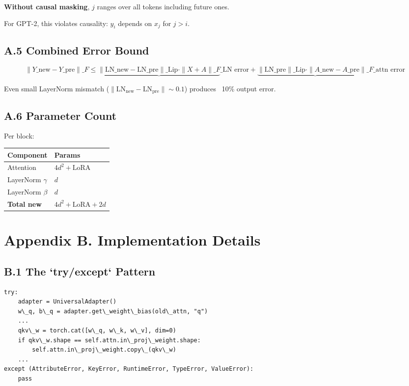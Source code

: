 \textbf{Without causal masking}, $j$ ranges over all tokens including future ones.

For GPT-2, this violates causality: $y_i$ depends on $x_j$ for $j > i$.

\subsection{A.5 Combined Error Bound}

\[
\|Y\_\text{new} - Y\_\text{pre}\|\_F \leq \underbrace{\|\text{LN}\_\text{new} - \text{LN}\_\text{pre}\|\_\text{Lip} \cdot \|X + A\|\_F}\_{\text{LN error}} + \underbrace{\|\text{LN}\_\text{pre}\|\_\text{Lip} \cdot \|A\_\text{new} - A\_\text{pre}\|\_F}\_{\text{attn error}}
\tag{A.7}
\]

Even small LayerNorm mismatch ($\|\text{LN}_\text{new} - \text{LN}_\text{pre}\| \sim 0.1$) 
produces ~10\% output error.

\subsection{A.6 Parameter Count}

Per block:

\begin{table}[H]
\centering
\small
\begin{tabular}{ll}
\toprule
\textbf{Component} & \textbf{Params} \\
\midrule
Attention & $4 d^2 + \text{LoRA}$ \\
LayerNorm $\gamma$ & $d$ \\
LayerNorm $\beta$ & $d$ \\
\textbf{Total new} & $4 d^2 + \text{LoRA} + 2d$ \\
\bottomrule
\end{tabular}
\end{table}




\section{Appendix B. Implementation Details}

\subsection{B.1 The `try/except` Pattern}

\begin{lstlisting}
try:
    adapter = UniversalAdapter()
    w\_q, b\_q = adapter.get\_weight\_bias(old\_attn, "q")
    ...
    qkv\_w = torch.cat([w\_q, w\_k, w\_v], dim=0)
    if qkv\_w.shape == self.attn.in\_proj\_weight.shape:
        self.attn.in\_proj\_weight.copy\_(qkv\_w)
    ...
except (AttributeError, KeyError, RuntimeError, TypeError, ValueError):
    pass
\end{lstlisting}

